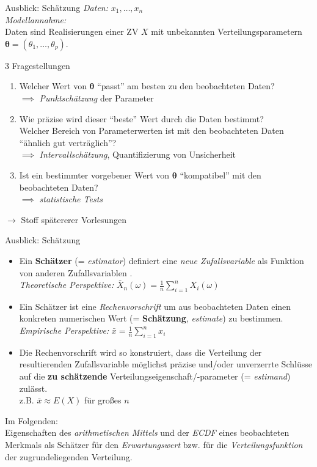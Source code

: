 \documentclass[
  10pt,
  ignorenonframetext,
]{beamer}
\providecommand{\tightlist}{%
  \setlength{\itemsep}{0pt}\setlength{\parskip}{0pt}}
\begin{document}
\begin{frame}{Ausblick: Schätzung}
\protect\hypertarget{ausblick-schuxe4tzung}{}
\emph{Daten:} \(x_1, \dots, x_n\)\\
\emph{Modellannahme:}\\
Daten sind Realisierungen einer ZV \(X\) mit unbekannten
Verteilungsparametern \(\symbf{\theta} = (\theta_1, \dots, \theta_p)\).

3 Fragestellungen

\begin{enumerate}
\tightlist
\item
  Welcher Wert von \(\symbf{\theta}\) ``passt'' am besten zu den
  beobachteten Daten?\\
  \(\implies\) \emph{Punktschätzung} der Parameter
\item
  Wie präzise wird dieser ``beste'' Wert durch die Daten bestimmt?\\
  Welcher Bereich von Parameterwerten ist mit den beobachteten Daten
  ``ähnlich gut verträglich''?\\
  \(\implies\) \emph{Intervallschätzung}, Quantifizierung von
  Unsicherheit
\item
  Ist ein bestimmter vorgebener Wert von \(\symbf{\theta}\)
  ``kompatibel'' mit den beobachteten Daten?\\
  \(\implies\) \emph{statistische Tests}
\end{enumerate}

\(\rightarrow\) Stoff spätererer Vorlesungen
\end{frame}

\begin{frame}{Ausblick: Schätzung}
\protect\hypertarget{ausblick-schuxe4tzung-1}{}
\begin{itemize}
\item
  Ein \textbf{Schätzer} (= \emph{estimator}) definiert eine \emph{neue
  Zufallsvariable} als Funktion von anderen Zufallsvariablen .\\
  \emph{Theoretische Perspektive:}
  \(\bar X_n(\omega) = \tfrac{1}{n} \sum^n_{i=1} X_i(\omega)\)
\item
  Ein Schätzer ist eine \emph{Rechenvorschrift} um aus beobachteten
  Daten einen konkreten numerischen Wert (= \textbf{Schätzung},
  \emph{estimate}) zu bestimmen.\\
  \emph{Empirische Perspektive:}
  \(\bar x = \tfrac{1}{n} \sum^n_{i=1} x_i\)
\item
  Die Rechenvorschrift wird so konstruiert, dass die Verteilung der
  resultierenden Zufallsvariable möglichst präzise und/oder unverzerrte
  Schlüsse auf die \textbf{zu schätzende}
  Verteilungseigenschaft/-parameter (= \emph{estimand}) zulässt.\\
  z.B. \(\bar x \approx E(X)\) für großes \(n\)
\end{itemize}

Im Folgenden:\\
Eigenschaften des \emph{arithmetischen Mittels} und der \emph{ECDF}
eines beobachteten Merkmals als Schätzer für den \emph{Erwartungswert}
bzw. für die \emph{Verteilungsfunktion} der zugrundeliegenden
Verteilung.
\end{frame}
\end{document}
